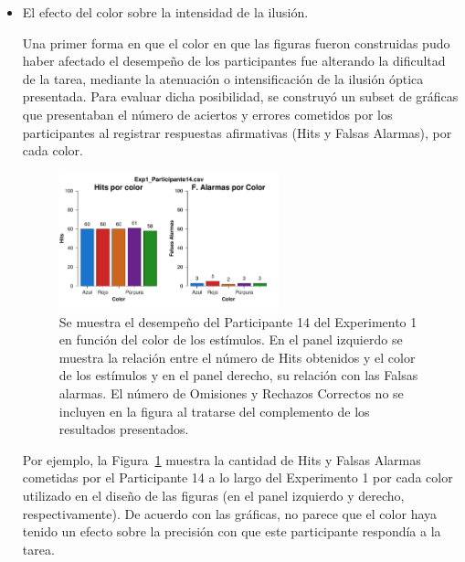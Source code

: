 \begin{itemize}
\item El efecto del color sobre la intensidad de la ilusión.

Una primer forma en que el color en que las figuras fueron construidas pudo haber afectado el desempeño de los participantes fue alterando la dificultad de la tarea, mediante la atenuación o intensificación de la ilusión óptica presentada. Para evaluar dicha posibilidad, se construyó un subset de gráficas que presentaban el número de aciertos y errores cometidos por los participantes al registrar respuestas afirmativas (Hits y Falsas Alarmas), por cada color.\\

\begin{figure}[th]
\centering
\includegraphics[width=0.60\textwidth]{Figures/Color_Exp1_P14}
\caption[Hits y Falsas Alarmas por Color; Ejemplo]{Se muestra el desempeño del Participante 14 del Experimento 1 en función del color de los estímulos. En el panel izquierdo se muestra la relación entre el número de Hits obtenidos y el color de los estímulos y en el panel derecho, su relación con las Falsas alarmas. El número de Omisiones y Rechazos Correctos no se incluyen en la figura al tratarse del complemento de los resultados presentados.}
\label{fig:Color_E1_P14}
\end{figure}

Por ejemplo, la Figura~\ref{fig:Color_E1_P14} muestra la cantidad de Hits y Falsas Alarmas cometidas por el Participante 14 a lo largo del Experimento 1 por cada color utilizado en el diseño de las figuras (en el panel izquierdo y derecho, respectivamente). De acuerdo con las gráficas, no parece que el color haya tenido un efecto sobre la precisión con que este participante respondía a la tarea.\\



\end{itemize}
